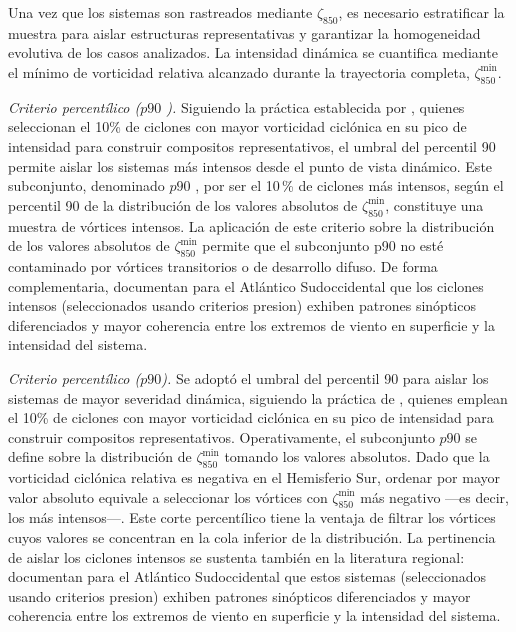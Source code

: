 Una vez que los sistemas son rastreados mediante $\zeta_{850}$, es necesario estratificar la muestra para aislar estructuras representativas y garantizar la homogeneidad evolutiva de los casos analizados. La intensidad dinámica se cuantifica mediante el mínimo de vorticidad relativa alcanzado durante la trayectoria completa, $\zeta_{850}^{\min}$.

\textit{Criterio percentílico ($p90$ ).} Siguiendo la práctica establecida por \citet{priestley2022improved}, quienes seleccionan el 10\% de ciclones con mayor vorticidad ciclónica en su pico de intensidad para construir compositos representativos, el umbral del percentil 90 permite aislar los sistemas más intensos desde el punto de vista dinámico. 
Este subconjunto, denominado $p90$ , por ser el 10\,\% de ciclones más intensos, según el percentil 90 de la distribución de los valores absolutos de $\zeta_{850}^{\min}$, constituye una muestra de vórtices intensos. 
La aplicación de este criterio sobre la distribución de los valores absolutos de $\zeta_{850}^{\min}$ permite que el subconjunto p90 no esté contaminado por vórtices transitorios o de desarrollo difuso. 
De forma complementaria, \citet{andrade2024composite} documentan para el Atlántico Sudoccidental que los ciclones intensos (seleccionados usando criterios presion) exhiben patrones sinópticos diferenciados y mayor coherencia entre los extremos de viento en superficie y la intensidad del sistema.

\textit{Criterio percentílico ($p90$).} 
Se adoptó el umbral del percentil 90 para aislar los sistemas de mayor severidad dinámica, siguiendo la práctica de \citet{priestley2022improved}, quienes emplean el 10\% de ciclones con mayor vorticidad ciclónica en su pico de intensidad para construir compositos representativos. 
Operativamente, el subconjunto $p90$ se define sobre la distribución de $\zeta_{850}^{\min}$ tomando los valores absolutos. Dado que la vorticidad ciclónica relativa es negativa en el Hemisferio Sur, ordenar por mayor valor absoluto equivale a seleccionar los vórtices con $\zeta_{850}^{\min}$ más negativo —es decir, los más intensos—. 
Este corte percentílico tiene la ventaja de filtrar los vórtices cuyos valores se concentran en la cola inferior de la distribución. 
La pertinencia de aislar los ciclones intensos se sustenta también en la literatura regional: \citet{andrade2024composite} documentan para el Atlántico Sudoccidental que estos sistemas (seleccionados usando criterios presion) exhiben patrones sinópticos diferenciados y mayor coherencia entre los extremos de viento en superficie y la intensidad del sistema.

